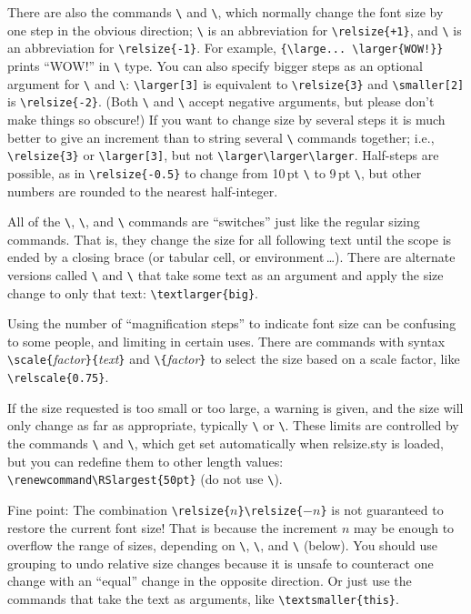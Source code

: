 \documentclass[12pt,pagesize=auto]{scrartcl}
\makeatletter
\newcommand*{\pkg}[1]{\textsf{#1}}
\newcommand*{\cs}[1]{\texttt{\textbackslash#1}}
\newcommand*{\cmd}[1]{\cs{\expandafter\@gobble\string#1}}
\newcommand*{\meta}[1]{\textlangle\textsl{#1}\textrangle}
\newcommand*{\marg}[1]{\texttt{\{}\meta{#1}\texttt{\}}}
\makeatother
\begin{document}
There are also the commands \cmd{\larger} and \cmd{\smaller}, which normally
change the font size by one step in the obvious direction; \cmd{\larger} is
an abbreviation for \verb|\relsize{+1}|, and \cmd{\smaller} is an
abbreviation for \verb|\relsize{-1}|. For example,
\verb+{\large... \larger{WOW!}}+ prints {\large ``WOW!''} in \cmd{\Large} 
type.  You can also specify bigger steps as an optional argument for 
\cmd{\larger} and \cmd{\smaller}: \verb+\larger[3]+ is equivalent to 
\verb+\relsize{3}+ and \verb+\smaller[2]+ is \verb+\relsize{-2}+.  (Both 
\cmd{\larger} and \cmd{\smaller} accept negative arguments, but please 
don't make things so obscure!)  If you want to change size by several steps 
it is much better to give an increment than to string several \cmd{\larger} 
commands together; i.e., \verb+\relsize{3}+ or \verb+\larger[3]+, but 
not \verb+\larger\larger\larger+.  Half-steps are possible, as in
\verb+\relsize{-0.5}+ to change from 10\,pt \cmd{\normalsize} to 9\,pt 
\cmd{\small}, but other numbers are rounded to the nearest half-integer.

All of the \cmd{\relsize}, \cmd{\larger}, and \cmd{\smaller} commands 
are ``switches'' just like the regular sizing commands.  That is, they 
change the size for all following text until the scope is ended by a 
closing brace (or tabular cell, or environment\,\dots).  There are
alternate versions called \cmd{\textlarger} and \cmd{\textsmaller} 
that take some text as an argument and apply the size change to only 
that text: \verb+\textlarger{big}+.

Using the number of ``magnification steps'' to indicate font size can
be confusing to some people, and limiting in certain uses.  There are 
commands with syntax \cmd{\text\-scale}\marg{factor}\marg{text} and 
\cmd{\relscale}\marg{factor} to select the size based on a scale factor, 
like \verb+\relscale{0.75}+.

If the size requested is too small or too large, a warning is given, and
the size will only change as far as appropriate, typically \cmd{\tiny} or 
\cmd{\Huge}.  These limits are controlled by the commands \cmd{\RSsmallest} 
and \cmd{\RSlargest}, which get set automatically when \pkg{relsize.sty} 
is loaded, but you can redefine them to other length values: 
\verb+\renewcommand\RSlargest{50pt}+ (do not use \cmd{\setlength}). 

\begin{small}

Fine point:  The combination 
\verb|\relsize{|$n$\verb|}\relsize{|$-n$\verb|}|
is not guaranteed to 
restore the current font size!  That is because the increment $n$ may be
enough to overflow the range of sizes, depending on \cmd{\RSsmallest},
\cmd{\RSlargest}, and \cmd{\RSpercentTolerance} (below). You should use 
grouping to undo relative size changes because it is unsafe to counteract 
one change with an ``equal'' change in the opposite direction. Or just use 
the commands that take the text as arguments, like \verb+\textsmaller{this}+.

\end{small}
\end{document}
